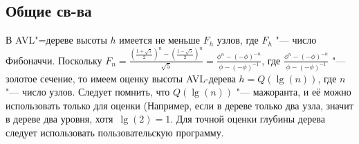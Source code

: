 \begin{frame}
    \section{Общие св-ва}
    
    В AVL"=дереве высоты $h$ имеется не меньше $F_h$ узлов, где $F_h$ "--- число Фибоначчи.
    Поскольку $F_n = \frac{(\frac{1 + \sqrt{5}}{2})^n - (\frac{1 - \sqrt{5}}{2})^n}{\sqrt{5}} =
    \frac{\phi^n - (-\phi)^{-n}}{\phi - (-\phi)^{-1}}$,
    где $\frac{\phi^n - (-\phi)^{-n}}{\phi - (-\phi)^{-1}}$ "--- золотое сечение,
    то имеем оценку высоты AVL-дерева $h = Q(\lg(n))$,
    где $n$ "--- число узлов. Следует помнить, что $Q(\lg(n))$ "--- мажоранта,
    и её можно использовать только для оценки
    (Например, если в дереве только два узла, значит в дереве два уровня,
    хотя $\lg(2) = 1$. Для точной оценки глубины дерева следует использовать пользовательскую программу.
\end{frame}